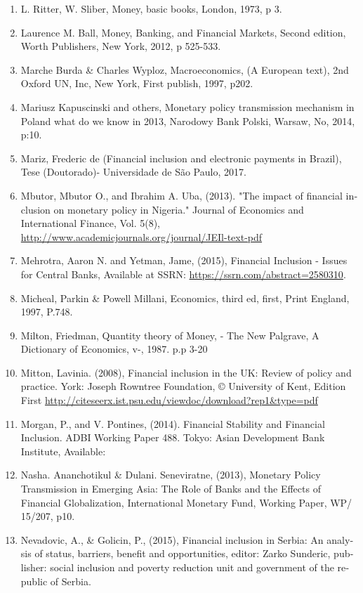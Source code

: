 \documentclass[10pt,a4paper]{report}
\begin{document}
\begin{english}
\begin{enumerate}
	\item L. Ritter, W. Sliber, Money, basic books, London, 1973, p 3.
	\item Laurence M. Ball, Money, Banking, and Financial Markets, Second edition, Worth Publishers, New York, 2012, p 525-533.
	\item Marche Burda \& Charles Wyploz, Macroeconomics, (A European text), 2nd Oxford UN, Inc, New York, First publish, 1997, p202.
	\item Mariusz Kapuscinski and others, Monetary policy transmission mechanism in Poland what do we know in 2013, Narodowy Bank Polski, Warsaw, No, 2014, p:10.
	\item Mariz, Frederic de (Financial inclusion and electronic payments in Brazil), Tese (Doutorado)- Universidade de São Paulo, 2017.
	\item Mbutor, Mbutor O., and Ibrahim A. Uba, (2013). "The impact of financial inclusion on monetary policy in Nigeria." Journal of Economics and International Finance, Vol. 5(8), \url{http://www.academicjournals.org/journal/JEIl-text-pdf}
	\item Mehrotra, Aaron N. and Yetman, Jame, (2015), Financial Inclusion - Issues for Central Banks, Available at SSRN: \url{https://ssrn.com/abstract=2580310}.
	\item Micheal, Parkin \& Powell Millani, Economics, third ed, first, Print England, 1997, P.748.
	\item Milton, Friedman, Quantity theory of Money, - The New Palgrave, A Dictionary of Economics, v-, 1987. p.p 3-20
	\item Mitton, Lavinia. (2008), Financial inclusion in the UK: Review of policy and practice. York: Joseph Rowntree Foundation, © University of Kent, Edition First \url{http://citeseerx.ist.psu.edu/viewdoc/download?rep1&type=pdf}
	\item Morgan, P., and V. Pontines, (2014). Financial Stability and Financial Inclusion. ADBI Working Paper 488. Tokyo: Asian Development Bank Institute, Available:
	\item Nasha. Ananchotikul \& Dulani. Seneviratne, (2013), Monetary Policy Transmission in Emerging Asia: The Role of Banks and the Effects of Financial Globalization, International Monetary Fund, Working Paper, WP/ 15/207, p10.
	\item Nevadovic, A., \& Golicin, P., (2015), Financial inclusion in Serbia: An analysis of status, barriers, benefit and opportunities, editor: Zarko Sunderic, publisher: social inclusion and poverty reduction unit and government of the republic of Serbia.

\end{enumerate}
\end{english}
\end{document}
